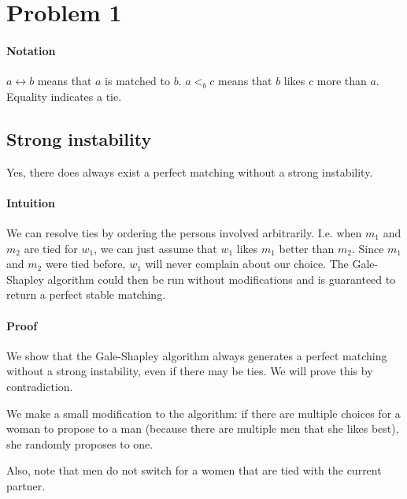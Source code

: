 \documentclass[12pt]{article}
\begin{document}
\section*{Problem 1}
\paragraph{Notation}
$a \leftrightarrow b$ means that $a$ is matched to $b$. $a <_{b} c$ means that $b$ likes $c$ more than $a$. Equality indicates a tie.

\subsection*{Strong instability}
Yes, there does always exist a perfect matching without a strong instability. 

\paragraph{Intuition}
We can resolve ties by ordering the persons involved arbitrarily. I.e. when $m_1$ and $m_2$ are tied for $w_1$, we can just assume that $w_1$ likes $m_1$ better than $m_2$. Since $m_1$ and $m_2$ were tied before, $w_1$ will never complain about our choice. The Gale-Shapley algorithm could then be run without modifications and is guaranteed to return a perfect stable matching.

\paragraph{Proof}
We show that the Gale-Shapley algorithm always generates a perfect matching without a strong instability, even if there may be ties. We will prove this by contradiction.

We make a small modification to the algorithm: if there are multiple choices for a woman to propose to a man (because there are multiple men that she likes best), she randomly proposes to one.

Also, note that men do not switch for a women that are tied with the current partner.
\end{document}
